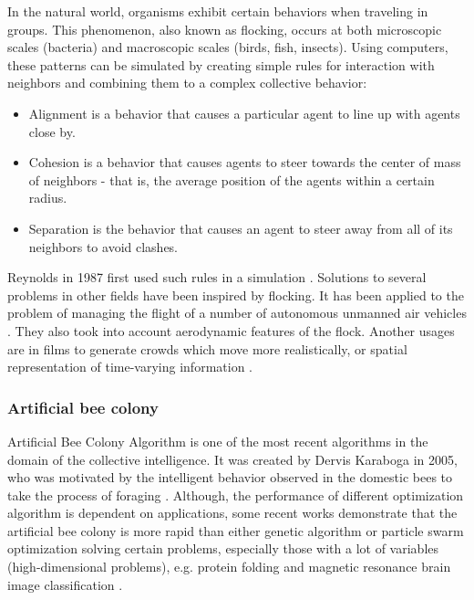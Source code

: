 In the natural world, organisms exhibit certain behaviors when traveling in groups. This phenomenon, also known as flocking, occurs at both microscopic scales (bacteria) and macroscopic scales (birds, fish, insects). Using computers, these patterns can be simulated by creating simple rules for interaction with neighbors and combining them to a complex collective behavior:
\begin{itemize}
  \item Alignment is a behavior that causes a particular agent to line up with agents close by.
  \item Cohesion is a behavior that causes agents to steer towards the center of mass of neighbors - that is, the average position of the agents within a certain radius.
  \item Separation is the behavior that causes an agent to steer away from all of its neighbors to avoid clashes.
\end{itemize}
Reynolds in 1987 first used such rules in a simulation \cite{Reynolds87Flocks}.
Solutions to several problems in other fields have been inspired by flocking. It has been applied to the problem of managing the flight of a number of autonomous unmanned air vehicles \cite{Crowther03FlockingAirVehicles}. They also took into account aerodynamic features of the flock. Another usages are in films to generate crowds which move more realistically, or spatial representation of time-varying information \cite{Moere04FlockingVisual}.


\subsubsection{Artificial bee colony} %
\label{ssub:artificial_bee_colony}

Artificial Bee Colony Algorithm is one of the most recent algorithms in the domain of the collective intelligence. It was created by Dervis Karaboga in 2005, who was motivated by the intelligent behavior observed in the domestic bees to take the process of foraging \cite{Karaboga07Bees}. Although, the performance of different optimization algorithm is dependent on applications, some recent works demonstrate that the artificial bee colony is more rapid than either genetic algorithm or particle swarm optimization solving certain problems, especially those with a lot of variables (high-dimensional problems), e.g. protein folding \cite{Li14BeesProtein} and magnetic resonance brain image classification \cite{Zhang11BeesMagnetic}.

